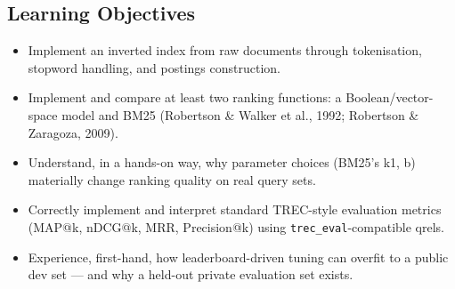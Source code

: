 \documentclass[10pt]{article}
\begin{document}
\subsection{Learning Objectives}
\begin{itemize}
\item Implement an inverted index from raw documents through tokenisation, stopword handling, and postings construction.
\item Implement and compare at least two ranking functions: a Boolean/vector-space model and BM25 (Robertson \& Walker et al., 1992; Robertson \& Zaragoza, 2009).
\item Understand, in a hands-on way, why parameter choices (BM25's k1, b) materially change ranking quality on real query sets.
\item Correctly implement and interpret standard TREC-style evaluation metrics (MAP@k, nDCG@k, MRR, Precision@k) using \texttt{trec\_eval}-compatible qrels.
\item Experience, first-hand, how leaderboard-driven tuning can overfit to a public dev set — and why a held-out private evaluation set exists.
\end{itemize}
\end{document}
